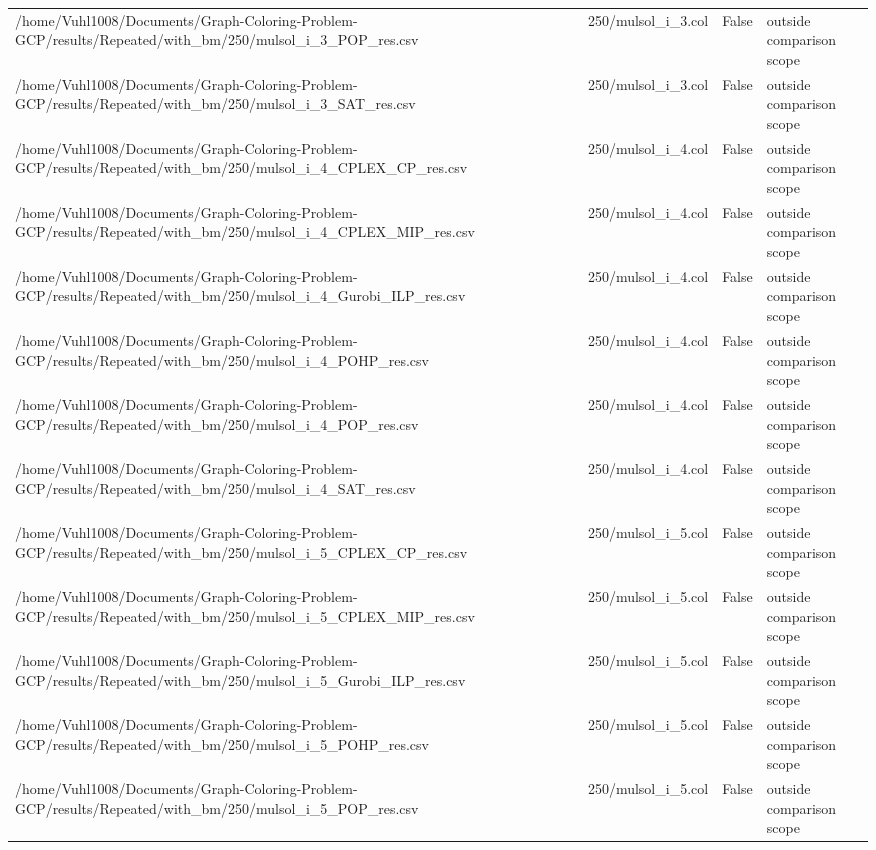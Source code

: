 \begin{table}[htbp]
\begin{tabular}{llll}
/home/Vuhl1008/Documents/Graph-Coloring-Problem-GCP/results/Repeated/with\_bm/250/mulsol\_i\_3\_POP\_res.csv & 250/mulsol\_i\_3.col & False & outside comparison scope \\
/home/Vuhl1008/Documents/Graph-Coloring-Problem-GCP/results/Repeated/with\_bm/250/mulsol\_i\_3\_SAT\_res.csv & 250/mulsol\_i\_3.col & False & outside comparison scope \\
/home/Vuhl1008/Documents/Graph-Coloring-Problem-GCP/results/Repeated/with\_bm/250/mulsol\_i\_4\_CPLEX\_CP\_res.csv & 250/mulsol\_i\_4.col & False & outside comparison scope \\
/home/Vuhl1008/Documents/Graph-Coloring-Problem-GCP/results/Repeated/with\_bm/250/mulsol\_i\_4\_CPLEX\_MIP\_res.csv & 250/mulsol\_i\_4.col & False & outside comparison scope \\
/home/Vuhl1008/Documents/Graph-Coloring-Problem-GCP/results/Repeated/with\_bm/250/mulsol\_i\_4\_Gurobi\_ILP\_res.csv & 250/mulsol\_i\_4.col & False & outside comparison scope \\
/home/Vuhl1008/Documents/Graph-Coloring-Problem-GCP/results/Repeated/with\_bm/250/mulsol\_i\_4\_POHP\_res.csv & 250/mulsol\_i\_4.col & False & outside comparison scope \\
/home/Vuhl1008/Documents/Graph-Coloring-Problem-GCP/results/Repeated/with\_bm/250/mulsol\_i\_4\_POP\_res.csv & 250/mulsol\_i\_4.col & False & outside comparison scope \\
/home/Vuhl1008/Documents/Graph-Coloring-Problem-GCP/results/Repeated/with\_bm/250/mulsol\_i\_4\_SAT\_res.csv & 250/mulsol\_i\_4.col & False & outside comparison scope \\
/home/Vuhl1008/Documents/Graph-Coloring-Problem-GCP/results/Repeated/with\_bm/250/mulsol\_i\_5\_CPLEX\_CP\_res.csv & 250/mulsol\_i\_5.col & False & outside comparison scope \\
/home/Vuhl1008/Documents/Graph-Coloring-Problem-GCP/results/Repeated/with\_bm/250/mulsol\_i\_5\_CPLEX\_MIP\_res.csv & 250/mulsol\_i\_5.col & False & outside comparison scope \\
/home/Vuhl1008/Documents/Graph-Coloring-Problem-GCP/results/Repeated/with\_bm/250/mulsol\_i\_5\_Gurobi\_ILP\_res.csv & 250/mulsol\_i\_5.col & False & outside comparison scope \\
/home/Vuhl1008/Documents/Graph-Coloring-Problem-GCP/results/Repeated/with\_bm/250/mulsol\_i\_5\_POHP\_res.csv & 250/mulsol\_i\_5.col & False & outside comparison scope \\
/home/Vuhl1008/Documents/Graph-Coloring-Problem-GCP/results/Repeated/with\_bm/250/mulsol\_i\_5\_POP\_res.csv & 250/mulsol\_i\_5.col & False & outside comparison scope \\

\end{tabular}
\end{table}
